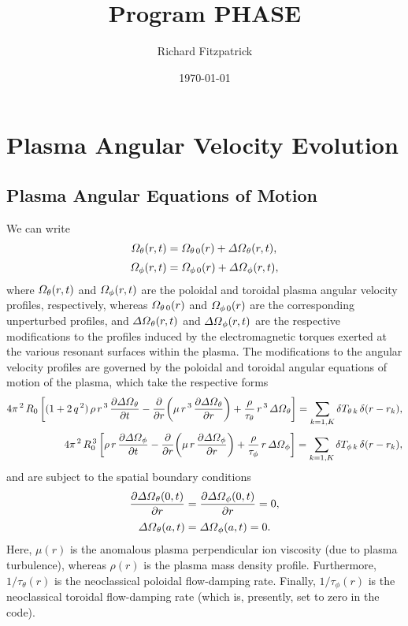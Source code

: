 \documentclass[12pt]{article}
\title{Program {\rm PHASE}}
\date{\today}
\author{Richard Fitzpatrick}
\begin{document}
\maketitle

\section{Plasma Angular Velocity Evolution}\label{appc}

\subsection{Plasma Angular Equations of Motion}
We can write
\begin{align}\label{e22x}
{\mit\Omega}_\theta(r,t) &={\mit\Omega}_{\theta\,0}(r) + {\mit\Delta\Omega}_\theta(r,t),\\[0.5ex]
{\mit\Omega}_\phi(r,t) &={\mit\Omega}_{\phi\,0}(r) + {\mit\Delta\Omega}_\phi(r,t),\label{e23x}
\end{align}
where  ${\mit\Omega}_{\theta}(r,t)$ and ${\mit\Omega}_{\phi}(r,t)$
  are the  poloidal and toroidal
plasma angular velocity profiles, respectively, whereas 
${\mit\Omega}_{\theta\,0}(r)$ and ${\mit\Omega}_{\phi\,0}(r)$ are
the corresponding unperturbed profiles, and 
 ${\mit\Delta\Omega}_{\theta}(r,t)$ and ${\mit\Delta\Omega}_{\phi}(r,t)$ 
are the respective modifications to the profiles induced by the  electromagnetic torques exerted at the various resonant surfaces
within the plasma. 
The modifications to the angular velocity profiles are governed by the poloidal and toroidal angular equations of
motion of the plasma, which take the respective
 forms
\begin{align}\label{eom1}
 4\pi^{\,2}\,R_0\left[(1+2\,q^{\,2})\,\rho\,r^{\,3}\,\frac{\partial{\mit\Delta\Omega}_\theta}{\partial t}-\frac{\partial}{\partial r}\!\left(
\mu\,r^{\,3}\,\frac{\partial{\mit\Delta\Omega}_\theta}{\partial r}\right) +\frac{\rho}{\tau_\theta}\,r^{\,3}\,{\mit\Delta\Omega}_\theta\right]
=\sum_{k=1,K} \delta T_{\theta\,k}\,\delta (r-r_k),\\[0.5ex]
 4\pi^{\,2}\,R_0^{\,3}\left[\rho\,r\,\frac{\partial{\mit\Delta\Omega}_\phi}{\partial t}-\frac{\partial}{\partial r}\!\left(
\mu\,r\,\frac{\partial{\mit\Delta\Omega}_\phi}{\partial r}\right) +\frac{\rho}{\tau_\phi}\,r\,{\mit\Delta\Omega}_\phi\right]
=\sum_{k=1,K} \delta T_{\phi\,k}\,\delta(r-r_k),\label{eom2}
\end{align}
and are subject to the spatial boundary conditions
\begin{align}
\frac{\partial{\mit\Delta\Omega}_\theta(0,t)}{\partial r} &=
\frac{\partial{\mit\Delta\Omega}_\phi(0,t)}{\partial r} =0,\\[0.5ex]
{\mit\Delta\Omega}_\theta(a,t)&={\mit\Delta\Omega}_\phi(a,t)=0.
\end{align}
Here, $\mu(r)$ is the anomalous plasma perpendicular ion viscosity (due to plasma turbulence),
whereas 
$\rho(r)$ 
 is the plasma mass density profile. 
Furthermore, $1/\tau_\theta(r)$
is  the neoclassical poloidal flow-damping rate.
Finally, $1/\tau_\phi(r)$ is  the neoclassical toroidal flow-damping rate (which is, presently, set to zero in the code). 
\end{document}

